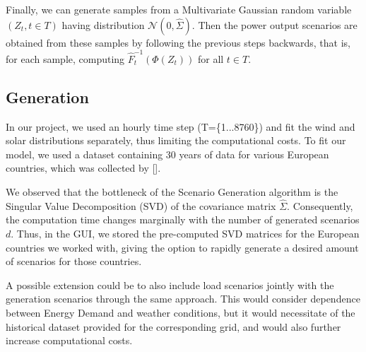 \documentclass[english]{article}
\numberwithin{definition}{section}
\numberwithin{theorem}{section}
\numberwithin{problem}{section}
\begin{document}
Finally, we can generate samples from a Multivariate Gaussian random variable \((Z_{t}, t \in T)\) having distribution \(\mathcal{N}(0, \hat \Sigma)\).  Then the power output scenarios are obtained from these samples by following the previous steps backwards, that is, for each sample, computing \(\hat F_{t}^{-1}(\Phi(Z_{t}))\) for all \(t\in T\). \\

\subsection{Generation}
In our project, we used an hourly time step (T=\{1...8760\}) and fit the wind and solar distributions separately, thus limiting the computational costs. To fit our model, we used a dataset containing 30 years of data for various European countries, which was collected by [\cite{PVDataSet}]. 

We observed that the bottleneck of the Scenario Generation algorithm is the Singular Value Decomposition (SVD) of the covariance matrix \(\hat{\Sigma}\). Consequently, the computation time changes marginally with the number of generated scenarios \(d\). Thus, in the GUI, we stored the pre-computed SVD matrices for the European countries we worked with, giving the option to rapidly generate a desired amount of scenarios for those countries.  %

A possible extension could be to also include load scenarios jointly with the generation scenarios through the same approach. This would consider dependence between Energy Demand and weather conditions, but it would necessitate of the historical dataset provided for the corresponding grid, and would also further increase computational costs.
\end{document}
